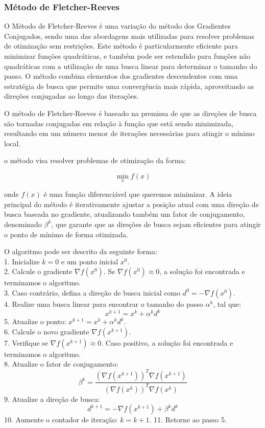 \documentclass[a4paper, 12pt]{article}
\begin{document}
\subsubsection{Método de Fletcher-Reeves}

O Método de Fletcher-Reeves é uma variação do método dos Gradientes Conjugados, sendo uma das abordagens mais utilizadas para resolver problemas de otimização sem restrições. Este método é particularmente eficiente para minimizar funções quadráticas, e também pode ser estendido para funções não quadráticas com a utilização de uma busca linear para determinar o tamanho do passo. O método combina elementos dos gradientes descendentes com uma estratégia de busca que permite uma convergência mais rápida, aproveitando as direções conjugadas ao longo das iterações.

O método de Fletcher-Reeves é baseado na premissa de que as direções de busca são tornadas conjugadas em relação à função que está sendo minimizada, resultando em um número menor de iterações necessárias para atingir o mínimo local. 


o método visa resolver problemas de otimização da forma:

\[
\min_x f(x)
\]

onde $f(x)$ é uma função diferenciável que queremos minimizar. A ideia principal do método é iterativamente ajustar a posição atual com uma direção de busca baseada no gradiente, atualizando também um fator de conjugamento, denominado $\beta^k$, que garante que as direções de busca sejam eficientes para atingir o ponto de mínimo de forma otimizada.

O algoritmo pode ser descrito da seguinte forma:\\

1. Inicialize $k = 0$ e um ponto inicial $x^0$.\\
2. Calcule o gradiente $\nabla f(x^0)$. Se $\nabla f(x^0) \approx 0$, a solução foi encontrada e terminamos o algoritmo.\\
3. Caso contrário, defina a direção de busca inicial como $d^0 = -\nabla f(x^0)$.\\
4. Realize uma busca linear para encontrar o tamanho do passo $\alpha^k$, tal que:
   \[
x^{k+1} = x^k + \alpha^k d^k
   \]
5. Atualize o ponto: $x^{k+1} = x^k + \alpha^k d^k$.\\
6. Calcule o novo gradiente $\nabla f(x^{k+1})$.\\
7. Verifique se $\nabla f(x^{k+1}) \approx 0$. Caso positivo, a solução foi encontrada e terminamos o algoritmo.\\
8. Atualize o fator de conjugamento:
   \[
   \beta^k = \frac{(\nabla f(x^{k+1}))^T \nabla f(x^{k+1})}{(\nabla f(x^k))^T \nabla f(x^k)}
   \]
9. Atualize a direção de busca:
   \[
   d^{k+1} = -\nabla f(x^{k+1}) + \beta^k d^k
   \]
10. Aumente o contador de iteração: $k = k + 1$.
11. Retorne ao passo 5.
\end{document}
